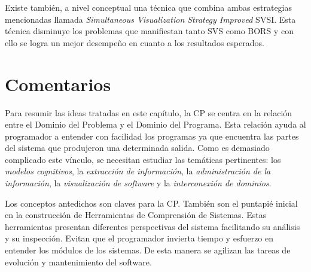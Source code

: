 \documentclass[a4paper,12pt]{report}
\begin{document}
Existe también, a nivel conceptual una técnica que combina ambas estrategias mencionadas llamada \textit{Simultaneous Visualization Strategy Improved} SVSI. Esta técnica disminuye los problemas que manifiestan tanto SVS como BORS y con ello se logra un mejor desempeño en cuanto a los resultados esperados\cite{BRM10,MPMR07}.

\section{Comentarios}

Para resumir las ideas tratadas en este capítulo, la CP se centra en la relación entre el Dominio del Problema y el Dominio del Programa. Esta relación ayuda al programador a entender con facilidad los programas ya que encuentra las partes del sistema que produjeron una determinada salida. Como es demasiado complicado este vínculo, se necesitan estudiar las temáticas pertinentes: los \textit{modelos cognitivos}, la \textit{extracción de información}, la \textit{administración de la información}, la \textit{visualización de software} y la \textit{interconexión de dominios}.




Los conceptos antedichos son claves para la CP. También son el puntapié inicial en la construcción de Herramientas de Comprensión de Sistemas. Estas herramientas presentan diferentes perspectivas del sistema facilitando su análisis y su inspección. Evitan que el programador invierta tiempo y esfuerzo en entender los módulos de los sistemas. De esta manera se agilizan las tareas de evolución y mantenimiento del software.
\end{document}
